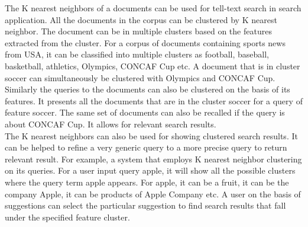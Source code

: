 \documentclass[12pt]{report}
\begin{document}
The K nearest neighbors of a documents can be used for tell-text search in search application. All the documents in the corpus can be clustered by K nearest neighbor. The document can be in multiple clusters based on the features extracted from the cluster. For a corpus of documents containing sports news from USA, it can be classified into multiple clusters as football, baseball, basketball, athletics, Olympics, CONCAF Cup etc. A document that is in cluster soccer can simultaneously be clustered with Olympics and CONCAF Cup. Similarly the queries to the documents can also be clustered on the basis of its features. It presents all the documents that are in the cluster soccer for a query of feature soccer. The same set of documents can also be recalled if the query is about CONCAF Cup. It allows for relevant search results.\\

The K nearest neighbors can also be used for showing clustered search results. It can be helped to refine a very generic query to a more precise query to return relevant result. For example, a system that employs K nearest neighbor clustering on its queries. For a user input query apple, it will show all the possible clusters where the query term apple appears. For apple, it can be a fruit, it can be the company Apple, it can be products of Apple Company etc. A user on the basis of suggestions can select the particular suggestion  to find search results that fall under the specified feature cluster.\\ 
  
\end{document}
